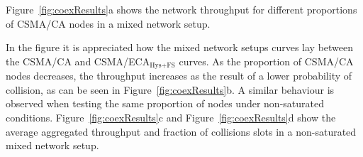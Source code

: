 	Figure~\ref{fig:coexResults}a shows the network throughput for different proportions of CSMA/CA nodes in a mixed network setup.
	
%	
%	
%	
%	
	
	In the figure it is appreciated how the mixed network setups curves lay between the CSMA/CA and CSMA/ECA$_{\text{Hys+FS}}$ curves. As the proportion of CSMA/CA nodes decreases, the throughput increases as the result of a lower probability of collision, as can be seen in Figure~\ref{fig:coexResults}b. A similar behaviour is observed when testing the same proportion of nodes under non-saturated conditions. Figure~\ref{fig:coexResults}c and Figure~\ref{fig:coexResults}d show the average aggregated throughput and fraction of collisions slots in a non-saturated mixed network setup.
	
